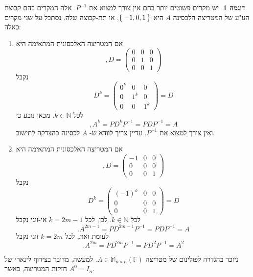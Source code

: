 \documentclass[12pt]{report}
\theoremstyle{plain}
\theoremstyle{definition}
\newtheorem{example}{דוגמה}[chapter]
\newcommand{\N}{\mathbb{N}}
\newcommand{\F}{\mathbb{F}}
\newcommand{\M}{\mathbb{M}}
\newcommand{\0}{\mathbf{0}}
\begin{document}
\begin{example}
יש מקרים פשוטים יותר בהם אין צורך למצוא את 
$P^{-1}$.
אלה המקרים בהם קבוצת הע"ע של המטריצה הלכסינה 
$A$
היא 
$\Set{-1,0,1}$,
או תת-קבוצה שלה. נסתכל על שני מקרים כאלה:

\begin{enumerate}[label=\alph*.]
\item 
אם המטריצה האלכסונית המתאימה היא 
$$
,D=\begin{pmatrix}
0 & 0 & 0 \\
0 & 1 & 0 \\
0 & 0 & 1
\end{pmatrix}
$$
נקבל
$$
D^k=\begin{pmatrix}
0^k & 0 & 0 \\
0 & 1^k & 0 \\
0 & 0 & 1^k
\end{pmatrix}=D
$$
לכל
$k\in\N$.
מכאן נובע כי
$$
,A^k=PD^kP^{-1}=PDP^{-1}=A
$$
ואין צורך למצוא את
$P^{-1}$.
עדיין צריך לוודא ש-
$A$
לכסינה כהצדקה לחישוב.


\item 
אם המטריצה האלכסונית המתאימה היא 
$$
,D=\begin{pmatrix}
-1 & 0 & 0 \\
0 & 0 & 0 \\
0 & 0 & 1
\end{pmatrix}
$$
נקבל
$$
D^k=\begin{pmatrix}
(-1)^k & 0 & 0 \\
0 & 0 & 0 \\
0 & 0 & 1
\end{pmatrix}=D
$$
לכל
$k\in\N$.
לכן, לכל 
$k=2m-1$
אי-זוגי נקבל
$$
.A^{2m-1}=PD^{2m-1}P^{-1}=PDP^{-1}=A
$$
לעומת זאת, לכל 
$k=2m$
זוגי נקבל
$$
.A^{2m}=PD^{2m}P^{-1}=PD^2P^{-1}=A^2
$$


\end{enumerate}
\end{example}

ניזכר בהגדרה
\label{def:matrix-polynomial}
לפולינום של מטריצה 
$A\in\M_{n\times n}(\F)$.
למעשה, מדובר בצירוף לינארי של חזקות המטריצה, כאשר 
$A^0=I_n$.
\end{document}
